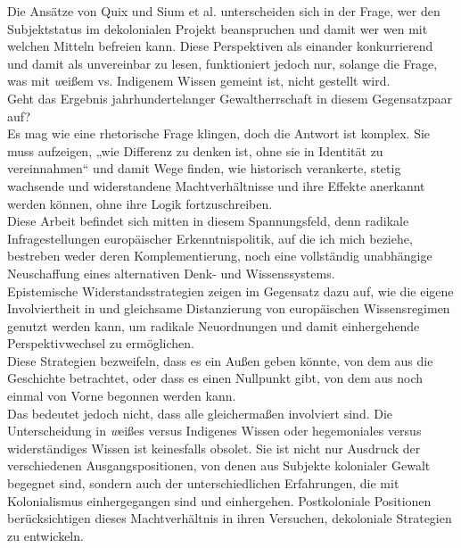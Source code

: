 Die Ansätze von Quix und Sium et al. unterscheiden sich in der Frage, wer den
Subjektstatus im dekolonialen Projekt beanspruchen und damit wer wen mit
welchen Mitteln befreien kann. Diese Perspektiven als einander konkurrierend
und damit als unvereinbar zu lesen, funktioniert jedoch nur, solange die Frage,
was mit \textit{w}eißem vs. Indigenem Wissen gemeint ist, nicht gestellt wird.\\
Geht das Ergebnis jahrhundertelanger Gewaltherrschaft in diesem Gegensatzpaar
auf? \\
Es mag wie eine rhetorische Frage klingen, doch die Antwort ist komplex. Sie
muss aufzeigen, „wie Differenz zu denken ist, ohne sie in Identität zu
vereinnahmen“\footnotemark{} und damit Wege finden, wie historisch verankerte, stetig
wachsende und widerstandene Machtverhältnisse und ihre Effekte anerkannt werden
können, ohne ihre Logik fortzuschreiben.\\
Diese Arbeit befindet sich mitten in
diesem Spannungsfeld, denn radikale Infragestellungen europäischer
Erkenntnispolitik, auf die ich mich beziehe, bestreben weder deren
Komplementierung, noch eine vollständig unabhängige Neuschaffung eines
alternativen Denk- und Wissenssystems.\\
Epistemische
Widerstandsstrategien\footnotemark{} zeigen im Gegensatz dazu
  auf, wie die eigene Involviertheit in und gleichsame Distanzierung von
  europäischen Wissensregimen genutzt werden kann, um radikale Neuordnungen und
  damit einhergehende Perspektivwechsel zu ermöglichen.\\
  Diese Strategien bezweifeln, dass es ein Außen geben könnte, von dem aus die
  Geschichte betrachtet, oder dass es einen Nullpunkt gibt, von dem aus noch
  einmal von Vorne begonnen werden kann.\\
  Das bedeutet jedoch nicht, dass alle gleichermaßen involviert sind. Die
  Unterscheidung in \textit{w}eißes versus Indigenes Wissen oder hegemoniales versus
  widerständiges Wissen ist keinesfalls obsolet. Sie ist nicht nur Ausdruck der
  verschiedenen Ausgangspositionen, von denen aus Subjekte kolonialer Gewalt
  begegnet sind, sondern auch der unterschiedlichen Erfahrungen, die mit
  Kolonialismus einhergegangen sind und einhergehen. Postkoloniale Positionen
  berücksichtigen dieses Machtverhältnis in ihren Versuchen, dekoloniale
  Strategien zu entwickeln.\\

